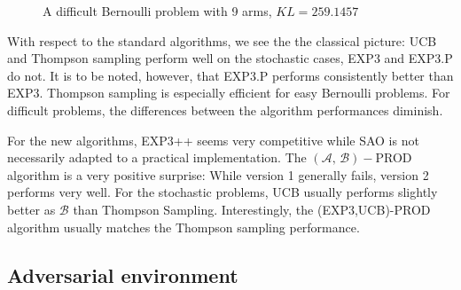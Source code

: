 \documentclass[10.5pt]{article}
\begin{document}
\begin{figure}[H]
  \label{fig:awesome_image3}
\endminipage
\caption{A difficult Bernoulli problem with 9 arms, $KL = 259.1457$}
\end{figure}

With respect to the standard algorithms, we see the the classical picture: UCB and Thompson sampling perform well on the stochastic cases, EXP3 and EXP3.P do not. It is to be noted, however, that EXP3.P performs consistently better than EXP3. Thompson sampling is especially efficient for easy Bernoulli problems. For difficult problems, the differences between the algorithm performances diminish.

For the new algorithms, EXP3++ seems very competitive while SAO is not necessarily adapted to a practical implementation. The $(\mathcal{A},\, \mathcal{B})-$PROD algorithm is a very positive surprise: While version 1 generally fails, version 2 performs very well. For the stochastic problems, UCB usually performs slightly better as $\mathcal{B}$ than Thompson Sampling. Interestingly, the (EXP3,UCB)-PROD algorithm usually matches the Thompson sampling performance.

\subsection*{Adversarial environment}
\end{document}
